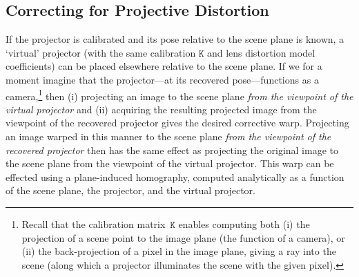 \documentclass[review]{elsarticle}
\begin{document}
{\subsection{Correcting for Projective Distortion}\label{sec:approach:homography}

If the projector is calibrated and its pose relative to the scene plane is known, a `virtual' projector (with the same calibration $\mathtt{K}$ and lens distortion model coefficients) can be placed elsewhere relative to the scene plane. If we for a moment imagine that the projector---at its recovered pose---functions as a camera,\footnote{Recall that the calibration matrix~$\mathtt{K}$ enables computing both (i) the projection of a scene point to the image plane (the function of a camera), or (ii) the back-projection of a pixel in the image plane, giving a ray into the scene (along which a projector illuminates the scene with the given pixel).} then (i) projecting an image to the scene plane \textit{from the viewpoint of the virtual projector} and (ii) acquiring the resulting projected image from the viewpoint of the recovered projector gives the desired corrective warp. Projecting an image warped in this manner to the scene plane \textit{from the viewpoint of the recovered projector} then has the same effect as projecting the original image to the scene plane from the viewpoint of the virtual projector. This warp can be effected using a plane-induced homography, computed analytically as a function of the scene plane, the projector, and the virtual projector.

}
\end{document}
